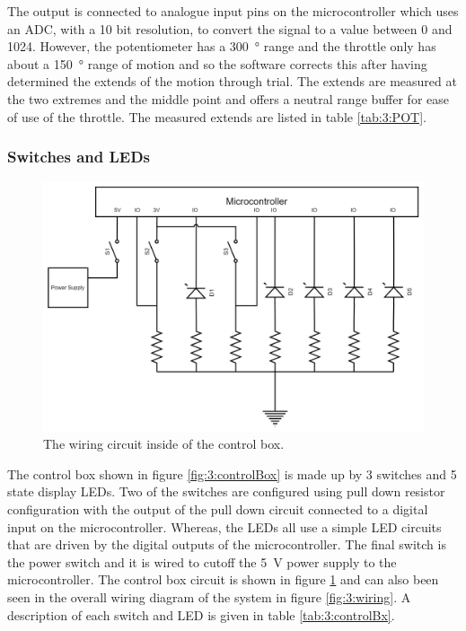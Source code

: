 		The output is connected to analogue input pins on the microcontroller which uses an ADC, with a 10 bit resolution, to convert the signal to a value between 0 and 1024. However, the potentiometer has a \SI{300}{\degree} range and the throttle only has about a \SI{150}{\degree} range of motion and so the software corrects this after having determined the extends of the motion through trial. The extends are measured at the two extremes and the middle point and offers a neutral range buffer for ease of use of the throttle. The measured extends are listed in table \ref{tab:3:POT}.
	\subsubsection{Switches and LEDs}
	\begin{figure}
		\begin{center}
			\includegraphics[width=0.65\linewidth]{figures/BoxCircuit}
			\caption{The wiring circuit inside of the control box.}
			\label{fig:3:controlCircuit}
		\end{center}
	\end{figure}
	The control box shown in figure \ref{fig:3:controlBox} is made up by 3 switches and 5 state display LEDs. Two of the switches are configured using pull down resistor configuration with the output of the pull down circuit connected to a digital input on the microcontroller. Whereas, the LEDs all use a simple LED circuits that are driven by the digital outputs of the microcontroller. The final switch is the power switch and it is wired to cutoff the \SI{5}{\volt} power supply to the microcontroller. The control box circuit is shown in figure \ref{fig:3:controlCircuit} and can also been seen in the overall wiring diagram of the system in figure \ref{fig:3:wiring}. A description of each switch and LED is given in table \ref{tab:3:controlBx}.
